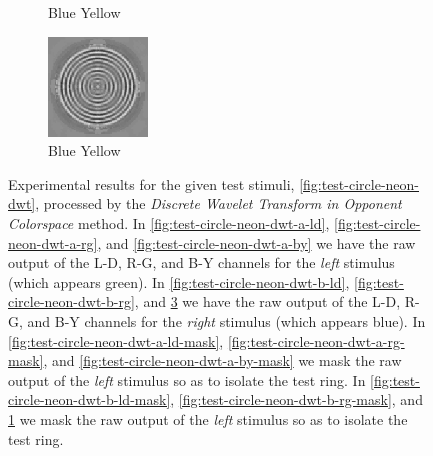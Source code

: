 \documentclass[journal,onecolumn]{IEEEtran}
\begin{document}
{\begin{figure}[H]
\begin{subfigure}[b]{0.25\textwidth}
            \caption{Blue Yellow}
            \label{fig:test-circle-neon-dwt-b-by-mask}
    \end{subfigure}%
    \begin{subfigure}[b]{0.25\textwidth}
            \centering
            \includegraphics[width=100px, frame]{test-circle-neon-dwt-b-by}
            \caption{Blue Yellow}
            \label{fig:test-circle-neon-dwt-b-by}
    \end{subfigure}
    \caption{Experimental results for the given test stimuli, \ref{fig:test-circle-neon-dwt}, processed by the \textit{Discrete Wavelet Transform in Opponent Colorspace} method. In \ref{fig:test-circle-neon-dwt-a-ld}, \ref{fig:test-circle-neon-dwt-a-rg}, and \ref{fig:test-circle-neon-dwt-a-by} we have the raw output of the L-D, R-G, and B-Y channels for the \textit{left} stimulus (which appears green). In \ref{fig:test-circle-neon-dwt-b-ld}, \ref{fig:test-circle-neon-dwt-b-rg}, and \ref{fig:test-circle-neon-dwt-b-by} we have the raw output of the L-D, R-G, and B-Y channels for the \textit{right} stimulus (which appears blue). In \ref{fig:test-circle-neon-dwt-a-ld-mask}, \ref{fig:test-circle-neon-dwt-a-rg-mask}, and \ref{fig:test-circle-neon-dwt-a-by-mask} we mask the raw output of the \textit{left} stimulus so as to isolate the test ring. In \ref{fig:test-circle-neon-dwt-b-ld-mask}, \ref{fig:test-circle-neon-dwt-b-rg-mask}, and \ref{fig:test-circle-neon-dwt-b-by-mask} we mask the raw output of the \textit{left} stimulus so as to isolate the test ring.}
\end{figure}
\clearpage
}
\end{document}
